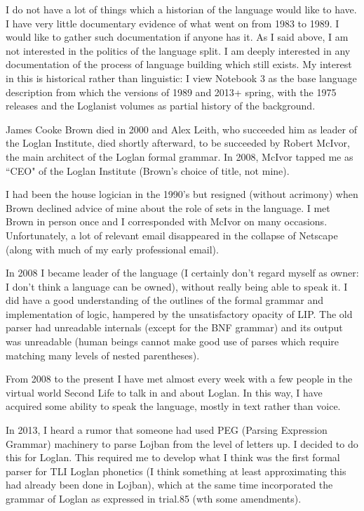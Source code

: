 \documentclass[12pt]{article}
\begin{document}
I do not have a lot of things which a historian of the language would like to have.  I have very little documentary evidence of what went on from 1983 to 1989.  I would like to gather such documentation if anyone has it.  As I said above, I am not interested in the politics of the language split.  I am deeply interested in any documentation of the process of language building which still exists.  My interest in this is historical rather than linguistic:  I view Notebook 3 as the base language description from which the versions of 1989 and 2013+ spring, with the 1975 releases and the Loglanist volumes as partial history of the background.

James Cooke Brown died in 2000 and Alex Leith, who succeeded him as leader of the Loglan Institute, died shortly afterward, to be succeeded by Robert McIvor, the main architect of the Loglan formal grammar.  In 2008, McIvor tapped me as ``CEO" of the Loglan Institute (Brown's choice of title, not mine).

I had been the house logician in the 1990's but resigned (without acrimony) when Brown declined advice of mine about the role of sets in the language.  I met Brown in person once and I corresponded with McIvor on many occasions.  Unfortunately, a lot of relevant email disappeared in the collapse of Netscape (along with much of my early professional email).

In 2008 I became leader of the language (I certainly don't regard myself as owner:  I don't think a language can be owned), without really being able to speak it.
I did have a good understanding of the outlines of the formal grammar and implementation of logic, hampered by the unsatisfactory opacity of LIP.  The old parser
had unreadable internals (except for the BNF grammar) and its output was unreadable (human beings cannot make good use of parses which require matching many levels of nested parentheses).

From 2008 to the present I have met almost every week with a few people in the virtual world Second Life to talk in and about Loglan.  In this way, I have acquired some ability to speak the language, mostly in text rather than voice.

In 2013, I heard a rumor that someone had used PEG (Parsing Expression Grammar) machinery to parse Lojban from the level of letters up.  I decided to do this for Loglan.  This required me to develop what I think was the first formal parser for TLI Loglan phonetics (I think something at least approximating this had already been done in Lojban), which at the same time incorporated the grammar of Loglan as expressed in trial.85 (wth some amendments).
\end{document}
